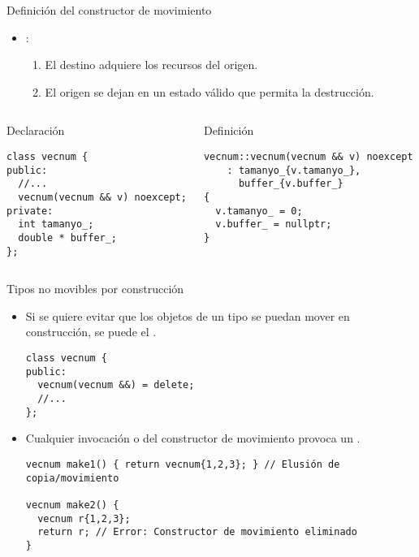 \begin{frame}[t,fragile]{Definición del constructor de movimiento}
\begin{itemize}
  \item {}:
    \begin{enumerate}
      \item El destino adquiere los recursos del origen.
      \item El origen se dejan en un estado válido que permita la destrucción.
    \end{enumerate}
\end{itemize}

\begin{columns}[T]

\pause
{}
\begin{block}{Declaración}
\begin{lstlisting}
class vecnum {
public:
  //...
  vecnum(vecnum && v) noexcept;
private:
  int tamanyo_;
  double * buffer_;
};
\end{lstlisting}
\end{block}

\pause
{}
\begin{block}{Definición}
\begin{lstlisting}
vecnum::vecnum(vecnum && v) noexcept
    : tamanyo_{v.tamanyo_},
      buffer_{v.buffer_}
{
  v.tamanyo_ = 0;
  v.buffer_ = nullptr;
}
\end{lstlisting}
\end{block}

\end{columns}
\end{frame}

\begin{frame}[t,fragile]{Tipos no movibles por construcción}
\begin{itemize}
  \item Si se quiere evitar que los objetos de un tipo se puedan mover en construcción,
        se puede  el .
\begin{lstlisting}
class vecnum {
public:
  vecnum(vecnum &&) = delete;
  //...
};
\end{lstlisting}

  \item Cualquier invocación  o 
        del constructor de movimiento provoca un .
\begin{lstlisting}
vecnum make1() { return vecnum{1,2,3}; } // Elusión de copia/movimiento

vecnum make2() {
  vecnum r{1,2,3};
  return r; // Error: Constructor de movimiento eliminado
}
\end{lstlisting}

\end{itemize}
\end{frame}

